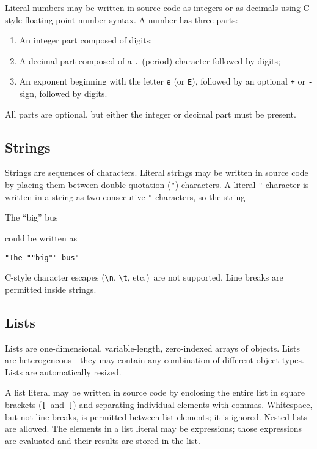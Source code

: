 Literal numbers may be written in source code as integers or as
decimals using C-style floating point number syntax.  A number has
three parts:
\begin{enumerate}
\item An integer part composed of digits;
\item A decimal part composed of a \verb+.+ (period) character
  followed by digits;
\item An exponent beginning with the letter \verb+e+ (or \verb+E+),
  followed by an optional \verb|+| or \verb|-| sign, followed by
  digits.
\end{enumerate}

All parts are optional, but either the integer or decimal part must be
present.


\subsection{Strings}
\label{strings}

Strings are sequences of  characters.  Literal strings may
be written in source code by placing them between double-quotation
(\verb+"+) characters.  A literal \verb+"+ character is written in a
string as two consecutive \verb+"+ characters, so the string

\begin{example}
The ``big'' bus
\end{example}

\noindent
could be written as 

\begin{example}
\verb+"The ""big"" bus"+
\end{example}

\noindent
C-style character escapes (\verb+\n+, \verb+\t+, etc.)\ are not
supported.  Line breaks are permitted inside strings.


\subsection{Lists}
\label{lists}

Lists are one-dimensional, variable-length, zero-indexed arrays of
objects.  Lists are heterogeneous---they may contain any combination
of different object types.  Lists are automatically resized.

A list literal may be written in source code by enclosing the entire
list in square brackets (\verb+[+~and~\verb+]+) and separating
individual elements with commas.  Whitespace, but not line breaks, is
permitted between list elements; it is ignored.  Nested lists are
allowed.  The elements in a list literal may be expressions; those
expressions are evaluated and their results are stored in the list.


